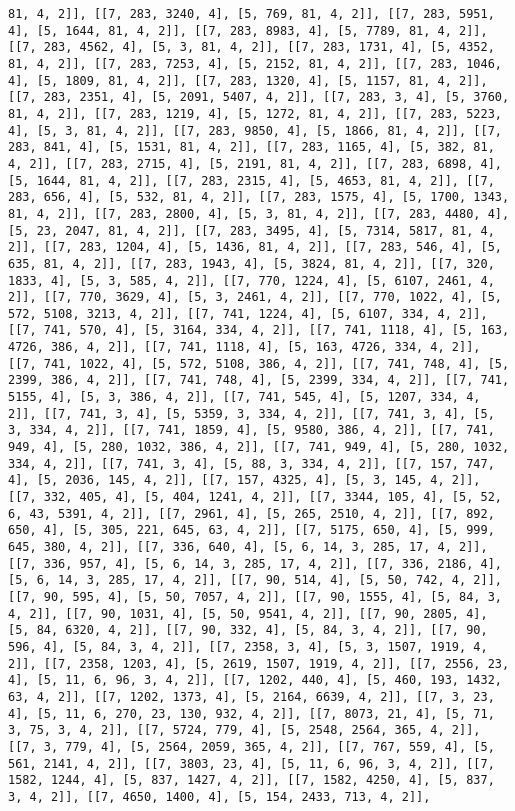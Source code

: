 \documentclass[12pt,fleqn]{article}\usepackage{../../common}
\begin{document}
\begin{verbatim}
81, 4, 2]], [[7, 283, 3240, 4], [5, 769, 81, 4, 2]], [[7, 283, 5951, 4], [5, 1644, 81, 4, 2]], [[7, 283, 8983, 4], [5, 7789, 81, 4, 2]], [[7, 283, 4562, 4], [5, 3, 81, 4, 2]], [[7, 283, 1731, 4], [5, 4352, 81, 4, 2]], [[7, 283, 7253, 4], [5, 2152, 81, 4, 2]], [[7, 283, 1046, 4], [5, 1809, 81, 4, 2]], [[7, 283, 1320, 4], [5, 1157, 81, 4, 2]], [[7, 283, 2351, 4], [5, 2091, 5407, 4, 2]], [[7, 283, 3, 4], [5, 3760, 81, 4, 2]], [[7, 283, 1219, 4], [5, 1272, 81, 4, 2]], [[7, 283, 5223, 4], [5, 3, 81, 4, 2]], [[7, 283, 9850, 4], [5, 1866, 81, 4, 2]], [[7, 283, 841, 4], [5, 1531, 81, 4, 2]], [[7, 283, 1165, 4], [5, 382, 81, 4, 2]], [[7, 283, 2715, 4], [5, 2191, 81, 4, 2]], [[7, 283, 6898, 4], [5, 1644, 81, 4, 2]], [[7, 283, 2315, 4], [5, 4653, 81, 4, 2]], [[7, 283, 656, 4], [5, 532, 81, 4, 2]], [[7, 283, 1575, 4], [5, 1700, 1343, 81, 4, 2]], [[7, 283, 2800, 4], [5, 3, 81, 4, 2]], [[7, 283, 4480, 4], [5, 23, 2047, 81, 4, 2]], [[7, 283, 3495, 4], [5, 7314, 5817, 81, 4, 2]], [[7, 283, 1204, 4], [5, 1436, 81, 4, 2]], [[7, 283, 546, 4], [5, 635, 81, 4, 2]], [[7, 283, 1943, 4], [5, 3824, 81, 4, 2]], [[7, 320, 1833, 4], [5, 3, 585, 4, 2]], [[7, 770, 1224, 4], [5, 6107, 2461, 4, 2]], [[7, 770, 3629, 4], [5, 3, 2461, 4, 2]], [[7, 770, 1022, 4], [5, 572, 5108, 3213, 4, 2]], [[7, 741, 1224, 4], [5, 6107, 334, 4, 2]], [[7, 741, 570, 4], [5, 3164, 334, 4, 2]], [[7, 741, 1118, 4], [5, 163, 4726, 386, 4, 2]], [[7, 741, 1118, 4], [5, 163, 4726, 334, 4, 2]], [[7, 741, 1022, 4], [5, 572, 5108, 386, 4, 2]], [[7, 741, 748, 4], [5, 2399, 386, 4, 2]], [[7, 741, 748, 4], [5, 2399, 334, 4, 2]], [[7, 741, 5155, 4], [5, 3, 386, 4, 2]], [[7, 741, 545, 4], [5, 1207, 334, 4, 2]], [[7, 741, 3, 4], [5, 5359, 3, 334, 4, 2]], [[7, 741, 3, 4], [5, 3, 334, 4, 2]], [[7, 741, 1859, 4], [5, 9580, 386, 4, 2]], [[7, 741, 949, 4], [5, 280, 1032, 386, 4, 2]], [[7, 741, 949, 4], [5, 280, 1032, 334, 4, 2]], [[7, 741, 3, 4], [5, 88, 3, 334, 4, 2]], [[7, 157, 747, 4], [5, 2036, 145, 4, 2]], [[7, 157, 4325, 4], [5, 3, 145, 4, 2]], [[7, 332, 405, 4], [5, 404, 1241, 4, 2]], [[7, 3344, 105, 4], [5, 52, 6, 43, 5391, 4, 2]], [[7, 2961, 4], [5, 265, 2510, 4, 2]], [[7, 892, 650, 4], [5, 305, 221, 645, 63, 4, 2]], [[7, 5175, 650, 4], [5, 999, 645, 380, 4, 2]], [[7, 336, 640, 4], [5, 6, 14, 3, 285, 17, 4, 2]], [[7, 336, 957, 4], [5, 6, 14, 3, 285, 17, 4, 2]], [[7, 336, 2186, 4], [5, 6, 14, 3, 285, 17, 4, 2]], [[7, 90, 514, 4], [5, 50, 742, 4, 2]], [[7, 90, 595, 4], [5, 50, 7057, 4, 2]], [[7, 90, 1555, 4], [5, 84, 3, 4, 2]], [[7, 90, 1031, 4], [5, 50, 9541, 4, 2]], [[7, 90, 2805, 4], [5, 84, 6320, 4, 2]], [[7, 90, 332, 4], [5, 84, 3, 4, 2]], [[7, 90, 596, 4], [5, 84, 3, 4, 2]], [[7, 2358, 3, 4], [5, 3, 1507, 1919, 4, 2]], [[7, 2358, 1203, 4], [5, 2619, 1507, 1919, 4, 2]], [[7, 2556, 23, 4], [5, 11, 6, 96, 3, 4, 2]], [[7, 1202, 440, 4], [5, 460, 193, 1432, 63, 4, 2]], [[7, 1202, 1373, 4], [5, 2164, 6639, 4, 2]], [[7, 3, 23, 4], [5, 11, 6, 270, 23, 130, 932, 4, 2]], [[7, 8073, 21, 4], [5, 71, 3, 75, 3, 4, 2]], [[7, 5724, 779, 4], [5, 2548, 2564, 365, 4, 2]], [[7, 3, 779, 4], [5, 2564, 2059, 365, 4, 2]], [[7, 767, 559, 4], [5, 561, 2141, 4, 2]], [[7, 3803, 23, 4], [5, 11, 6, 96, 3, 4, 2]], [[7, 1582, 1244, 4], [5, 837, 1427, 4, 2]], [[7, 1582, 4250, 4], [5, 837, 3, 4, 2]], [[7, 4650, 1400, 4], [5, 154, 2433, 713, 4, 2]], 
\end{verbatim}
\end{document}
